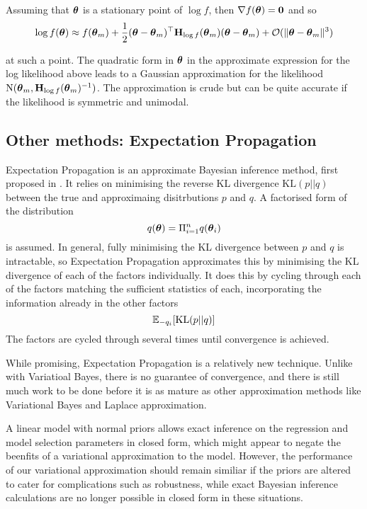 \noindent Assuming that ${\boldsymbol \theta}$ is a stationary point of $\log f$, then $\nabla f({\boldsymbol \theta}) = {\bf 0}$ and so
$$
\log f({\boldsymbol \theta}) \approx f({\boldsymbol \theta}_m) + \frac{1}{2} ({\boldsymbol \theta} - {\boldsymbol \theta}_m)^\top {\bf H}_{\log f}({\boldsymbol \theta}_m) ({\boldsymbol \theta} - {\boldsymbol \theta}_m) + {\mathcal O}(\|{\boldsymbol \theta} - {\boldsymbol \theta}_m\|^3)
$$

\noindent at such a point. The quadratic form in ${\boldsymbol \theta}$ in the approximate expression for the log
likelihood above leads to a Gaussian approximation for the likelihood $\text{N}({\boldsymbol \theta}_m, {\bf H}_{\log
f}({\boldsymbol \theta}_m)^{-1})$. The approximation is crude but can be quite accurate if the likelihood is symmetric and
unimodal.

\subsection{Other methods: Expectation Propagation}
Expectation Propagation is an approximate Bayesian inference method, first proposed in \citep{Minka2001}.
It relies on minimising the reverse KL divergence $\text{KL}(p || q)$ between the true and approximaing
disitrbutions $p$ and $q$. A factorised form of the distribution
\[
	q({\boldsymbol \theta}) = \Pi_{i=1}^n q({\boldsymbol \theta}_i)
\]
is assumed. In general, fully minimising the KL divergence between $p$ and $q$ is intractable, so Expectation
Propagation approximates this by minimising the KL divergence of each of the factors individually.
It does this by cycling through each of the factors matching the sufficient statistics of each, incorporating
the information already in the other factors
\[
	{\mathbb E}_{-q_i} [\text{KL}(p || q)]
\]
The factors are cycled through several times until convergence is achieved.

While promising, Expectation Propagation is a relatively new technique.
Unlike with Variatioal Bayes, there is no guarantee of convergence, and there is still much work to be done
before it is as mature as other approximation methods like Variational Bayes and Laplace approximation.

A linear model with normal priors allows exact inference on the regression and model selection parameters in
closed form, which might appear to negate the beenfits of a variational approximation to the model. However,
the performance of our variational approximation should remain similiar if the priors are altered to cater for
complications such as robustness, while exact Bayesian inference calculations are no longer possible in closed
form in these situations.

